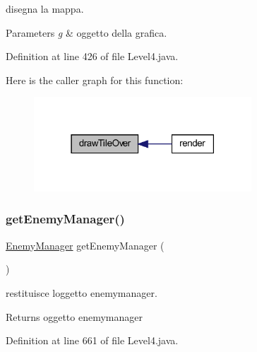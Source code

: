 disegna la mappa. 


\begin{DoxyParams}{Parameters}
{\em g} & oggetto della grafica. \\
\hline
\end{DoxyParams}


Definition at line 426 of file Level4.\+java.

Here is the caller graph for this function\+:\nopagebreak
\begin{figure}[H]
\begin{center}
\leavevmode
\includegraphics[width=231pt]{classscenes_1_1_level4_ac299bbbbb70f97ae032c1345d5937378_icgraph}
\end{center}
\end{figure}
\mbox{\label{classscenes_1_1_level4_afdfe86992bb21f6ad2d9aea028b7896a}} 
\subsubsection{\texorpdfstring{get\+Enemy\+Manager()}{getEnemyManager()}}
{\footnotesize\ttfamily \hyperlink{classmanagers_1_1_enemy_manager}{Enemy\+Manager} get\+Enemy\+Manager (\begin{DoxyParamCaption}{ }\end{DoxyParamCaption})}



restituisce l\textquotesingle{}oggetto enemymanager. 

\begin{DoxyReturn}{Returns}
oggetto enemymanager 
\end{DoxyReturn}


Definition at line 661 of file Level4.\+java.

\mbox{\label{classscenes_1_1_level4_af5e9f906de91e4d6400bb7f27cd563f3}} 
